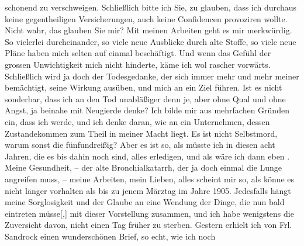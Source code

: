 \begin{ledgroupsized}[t]{13cm}
               schonend zu verschweigen. Schließlich bitte ich Sie, zu glauben, dass ich durchaus
               keine gegentheiligen Versicherungen, auch keine Confidencen provoziren wollte. Nicht
               wahr, das glauben Sie mir?\pend
           \pstart
           {\pb}Mit meinen Arbeiten geht es
               mir merkwürdig. So vielerlei durcheinander, so viele neue Ausblicke durch alte
               Stoffe, so viele neue Pläne haben mich selten auf einmal beschäftigt. Und wenn das
               Gefühl der grossen Unwichtigkeit mich nicht hinderte, käme ich wol rascher vorwärts.
               Schließlich wird ja doch der Todesgedanke, der sich immer mehr und mehr meiner
               bemächtigt, seine Wirkung ausüben, und mich an ein Ziel führen. Ist es nicht
               sonderbar, dass ich an den Tod unabläßiger denn je, aber ohne Qual und ohne Angst, ja
               beinahe mit Neugierde denke? Ich bilde mir aus mehrfachen Gründen ein, dass ich
                  \label{K_L03266-4v}\label{K_L03266-4h} werde, und ich denke daran, wie an
               ein Unternehmen, dessen Zustandekommen zum Theil in meiner Macht liegt. Es ist nicht
               Selbstmord, warum sonst die fünfundreißig? Aber es ist so, als müsste ich in diesen
                  {\pb}acht Jahren, die es bis
               dahin noch sind, alles erledigen, und als wäre ich dann eben \label{K_L03266-5v}\label{K_L03266-5h}. Meine Gesundheit, – der alte Bronchialkatarrh, der ja doch einmal
               die Lunge angreifen muss, – meine Arbeiten, mein Lieben, alles scheint mir so, als
               könne es nicht länger vorhalten als bis zu jenem Märztag im Jahre 1905. Jedesfalls hängt meine Sorglosigkeit und der Glaube an eine Wendung
               der Dinge, die nun bald eintreten müsse{[},{]} mit dieser Vorstellung
               zusammen, und ich habe wenigstens die Zuversicht davon, nicht einen Tag früher zu
               sterben.\pend
           \pstart
           Gestern erhielt ich von Frl. Sandrock einen wunderschönen Brief, so echt, wie ich noch

\end{ledgroupsized}
